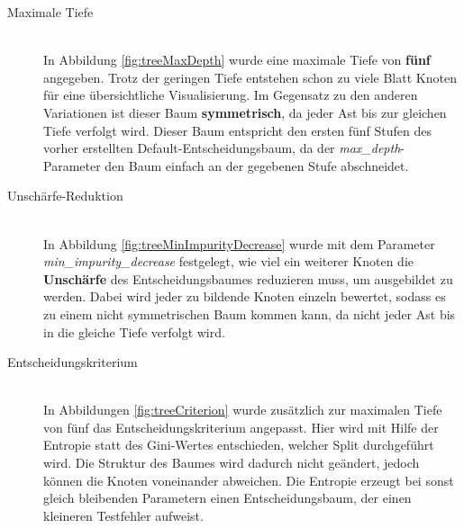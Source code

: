 \begin{description}
	\item[Maximale Tiefe]\hfill \\
	In Abbildung \ref{fig:treeMaxDepth} wurde eine maximale Tiefe von \textbf{fünf} angegeben. Trotz der geringen Tiefe entstehen schon zu viele Blatt Knoten für eine übersichtliche Visualisierung. Im Gegensatz zu den anderen Variationen ist dieser Baum \textbf{symmetrisch}, da jeder Ast bis zur gleichen Tiefe verfolgt wird. Dieser Baum entspricht den ersten fünf Stufen des vorher erstellten Default-Entscheidungsbaum, da der \emph{max\_depth}-Parameter den Baum einfach an der gegebenen Stufe abschneidet.
	\item[Unschärfe-Reduktion]\hfill \\ 
	In Abbildung \ref{fig:treeMinImpurityDecrease} wurde mit dem Parameter \emph{min\_impurity\_decrease} festgelegt, wie viel ein weiterer Knoten die \textbf{Unschärfe} des Entscheidungsbaumes reduzieren muss, um ausgebildet zu werden. Dabei wird jeder zu bildende Knoten einzeln bewertet, sodass es zu einem nicht symmetrischen Baum kommen kann, da nicht jeder Ast bis in die gleiche Tiefe verfolgt wird.
	\item[Entscheidungskriterium]\hfill \\ 
	In Abbildungen \ref{fig:treeCriterion} wurde zusätzlich zur maximalen Tiefe von fünf das Entscheidungskriterium angepasst. Hier wird mit Hilfe der Entropie statt des Gini-Wertes entschieden, welcher Split durchgeführt wird. Die Struktur des Baumes wird dadurch nicht geändert, jedoch können die Knoten voneinander abweichen. Die Entropie erzeugt bei sonst gleich bleibenden Parametern einen Entscheidungsbaum, der einen kleineren Testfehler aufweist.
\end{description}
